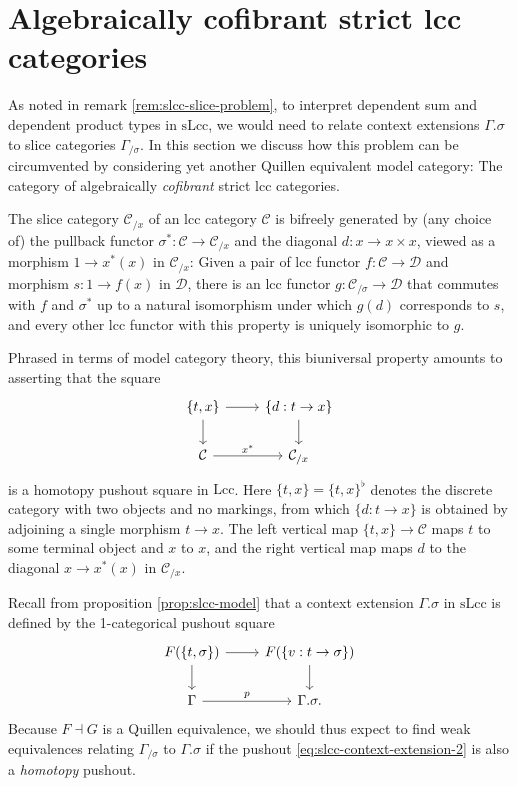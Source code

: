 \documentclass[a4paper]{article}
\theoremstyle{remark}
\theoremstyle{definition}
\begin{document}
\section{Algebraically cofibrant strict lcc categories}
\label{sec:algebraically-cofibrant}

As noted in remark \ref{rem:slcc-slice-problem}, to interpret dependent sum and dependent product types in $\mathrm{sLcc}$, we would need to relate context extensions $\Gamma.\sigma$ to slice categories $\Gamma_{/ \sigma}$.
In this section we discuss how this problem can be circumvented by considering yet another Quillen equivalent model category: The category of algebraically \emph{cofibrant} strict lcc categories.

The slice category $\mathcal{C}_{/ x}$ of an lcc category $\mathcal{C}$ is bifreely generated by (any choice of) the pullback functor $\sigma^* : \mathcal{C} \rightarrow \mathcal{C}_{/ x}$ and the diagonal $d : x \rightarrow x \times x$, viewed as a morphism $1 \rightarrow x^*(x)$ in $\mathcal{C}_{/ x}$:
Given a pair of lcc functor $f : \mathcal{C} \rightarrow \mathcal{D}$ and morphism $s : 1 \rightarrow f(x)$ in $\mathcal{D}$, there is an lcc functor $g : \mathcal{C}_{/ \sigma} \rightarrow \mathcal{D}$ that commutes with $f$ and $\sigma^*$ up to a natural isomorphism under which $g(d)$ corresponds to $s$, and every other lcc functor with this property is uniquely isomorphic to $g$.

Phrased in terms of model category theory, this biuniversal property amounts to asserting that the square
\begin{equation}
  \label{eq:homotopy-pushout-lcc}
  \begin{tikzcd}
    \{ t, x \} \arrow[r] \arrow[d] & \{ d : t \rightarrow x \} \arrow[d] \\
    \mathcal{C} \arrow[r, "x^*"] & \mathcal{C}_{/ x}
  \end{tikzcd}
\end{equation}
is a homotopy pushout square in $\mathrm{Lcc}$.
Here $\{t, x\} = \{t, x\}^\flat$ denotes the discrete category with two objects and no markings, from which $\{d : t \rightarrow x\}$ is obtained by adjoining a single morphism $t \rightarrow x$.
The left vertical map $\{ t, x \} \rightarrow \mathcal{C}$ maps $t$ to some terminal object and $x$ to $x$, and the right vertical map maps $d$ to the diagonal $x \rightarrow x^*(x)$ in $\mathcal{C}_{/ x}$.

Recall from proposition \ref{prop:slcc-model} that a context extension $\Gamma.\sigma$ in $\mathrm{sLcc}$ is defined by the 1-categorical pushout square
\begin{equation}
  \label{eq:slcc-context-extension-2}
  \begin{tikzcd}
    F(\{ t, \sigma \}) \arrow[d] \arrow[r] & F(\{ v : t \rightarrow \sigma \}) \arrow[d] \\
    \Gamma \arrow[r, "p"] & \Gamma.\sigma.
  \end{tikzcd}
\end{equation}
Because $F \dashv G$ is a Quillen equivalence, we should thus expect to find weak equivalences relating $\Gamma_{/ \sigma}$ to $\Gamma.\sigma$ if the pushout \eqref{eq:slcc-context-extension-2} is also a \emph{homotopy} pushout.
\end{document}
